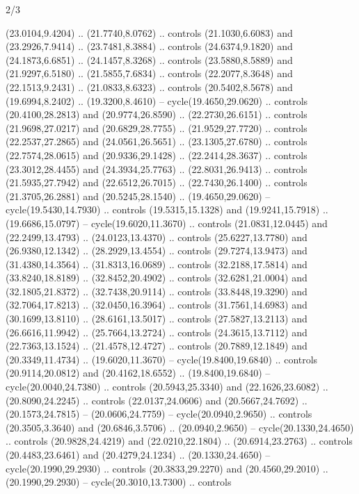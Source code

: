 \begin{flagdescription}{2/3}
\begin{scope}[yshift=\flagwidth,scale=\flagwidth/1241.93737]
\begin{scope}[y=-1mm, x=1mm,draw=gold,fill=blue,line join=miter,miter limit=4,line width=1.8\lw]
\begin{scope}[y=1mm, x=1mm, yscale=-1,shift={(573.68mm+\str,145.75)}]
\begin{scope}[scale=1.35,shift={(-9,-3)}]
\begin{scope}[scale=0.55]
\begin{scope}[scale=1.333]
    (23.0104,9.4204) .. (21.7740,8.0762) .. controls (21.1030,6.6083) and
    (23.2926,7.9414) .. (23.7481,8.3884) .. controls (24.6374,9.1820) and
    (24.1873,6.6851) .. (24.1457,8.3268) .. controls (23.5880,8.5889) and
    (21.9297,6.5180) .. (21.5855,7.6834) .. controls (22.2077,8.3648) and
    (22.1513,9.2431) .. (21.0833,8.6323) .. controls (20.5402,8.5678) and
    (19.6994,8.2402) .. (19.3200,8.4610) -- cycle(19.4650,29.0620) .. controls
    (20.4100,28.2813) and (20.9774,26.8590) .. (22.2730,26.6151) .. controls
    (21.9698,27.0217) and (20.6829,28.7755) .. (21.9529,27.7720) .. controls
    (22.2537,27.2865) and (24.0561,26.5651) .. (23.1305,27.6780) .. controls
    (22.7574,28.0615) and (20.9336,29.1428) .. (22.2414,28.3637) .. controls
    (23.3012,28.4455) and (24.3934,25.7763) .. (22.8031,26.9413) .. controls
    (21.5935,27.7942) and (22.6512,26.7015) .. (22.7430,26.1400) .. controls
    (21.3705,26.2881) and (20.5245,28.1540) .. (19.4650,29.0620) --
    cycle(19.5430,14.7930) .. controls (19.5315,15.1328) and (19.9241,15.7918) ..
    (19.6686,15.0797) -- cycle(19.6020,11.3670) .. controls (21.0831,12.0445) and
    (22.2499,13.4793) .. (24.0123,13.4370) .. controls (25.6227,13.7780) and
    (26.9380,12.1342) .. (28.2929,13.4554) .. controls (29.7274,13.9473) and
    (31.4380,14.3564) .. (31.8313,16.0689) .. controls (32.2188,17.5814) and
    (33.8240,18.8189) .. (32.8452,20.4902) .. controls (32.6281,21.0004) and
    (32.1805,21.8372) .. (32.7438,20.9114) .. controls (33.8448,19.3290) and
    (32.7064,17.8213) .. (32.0450,16.3964) .. controls (31.7561,14.6983) and
    (30.1699,13.8110) .. (28.6161,13.5017) .. controls (27.5827,13.2113) and
    (26.6616,11.9942) .. (25.7664,13.2724) .. controls (24.3615,13.7112) and
    (22.7363,13.1524) .. (21.4578,12.4727) .. controls (20.7889,12.1849) and
    (20.3349,11.4734) .. (19.6020,11.3670) -- cycle(19.8400,19.6840) .. controls
    (20.9114,20.0812) and (20.4162,18.6552) .. (19.8400,19.6840) --
    cycle(20.0040,24.7380) .. controls (20.5943,25.3340) and (22.1626,23.6082) ..
    (20.8090,24.2245) .. controls (22.0137,24.0606) and (20.5667,24.7692) ..
    (20.1573,24.7815) -- (20.0606,24.7759) -- cycle(20.0940,2.9650) .. controls
    (20.3505,3.3640) and (20.6846,3.5706) .. (20.0940,2.9650) --
    cycle(20.1330,24.4650) .. controls (20.9828,24.4219) and (22.0210,22.1804) ..
    (20.6914,23.2763) .. controls (20.4483,23.6461) and (20.4279,24.1234) ..
    (20.1330,24.4650) -- cycle(20.1990,29.2930) .. controls (20.3833,29.2270) and
    (20.4560,29.2010) .. (20.1990,29.2930) -- cycle(20.3010,13.7300) .. controls

\end{scope}
\end{scope}
\end{scope}
\end{scope}
\end{scope}
\end{scope}
\end{flagdescription}
